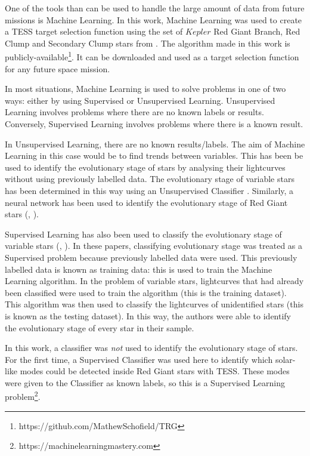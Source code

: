 \documentclass[a4paper,fleqn,usenatbib,useAMS]{mnras}
\begin{document}
One of the tools than can be used to handle the large amount of data from future missions is Machine Learning. In this work, Machine Learning was used to create a TESS target selection function using the set of $Kepler$ Red Giant Branch, Red Clump and Secondary Clump stars from \citet{davies_asteroseismology_2016}. The algorithm made in this work is publicly-available\footnote{https://github.com/MathewSchofield/TRG}. It can be downloaded and used as a target selection function for any future space mission.

In most situations, Machine Learning is used to solve problems in one of two ways: either by using Supervised or Unsupervised Learning. Unsupervised Learning involves problems where there are no known labels or results. Conversely, Supervised Learning involves problems where there is a known result.

In Unsupervised Learning, there are no known results/labels. The aim of Machine Learning in this case would be to find trends between variables. This has been be used to identify the evolutionary stage of stars by analysing their lightcurves without using previously labelled data. The evolutionary stage of variable stars has been determined in this way using an Unsupervised Classifier \citep{valenzuela_unsupervised_2018}. Similarly, a neural network has been used to identify the evolutionary stage of Red Giant stars (\citet{hon_deep_2017}, \citet{hon_deep_2018}).

Supervised Learning has also been used to classify the evolutionary stage of variable stars (\citet{nun_supervised_2014}, \citet{elorrieta_machine_2016}). In these papers, classifying evolutionary stage was treated as a Supervised problem because previously labelled data were used. This previously labelled data is known as training data: this is used to train the Machine Learning algorithm. In the problem of variable stars, lightcurves that had already been classified were used to train the algorithm (this is the training dataset). This algorithm was then used to classify the lightcurves of unidentified stars (this is known as the testing dataset). In this way, the authors were able to identify the evolutionary stage of every star in their sample.

In this work, a classifier was \textit{not} used to identify the evolutionary stage of stars. For the first time, a Supervised Classifier was used here to identify which solar-like modes could be detected inside Red Giant stars with TESS. These modes were given to the Classifier as known labels, so this is a Supervised Learning problem\footnote{https://machinelearningmastery.com}.
\end{document}
